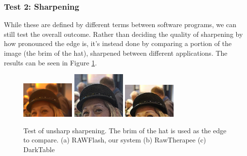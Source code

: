 \documentclass[10pt,a4paper]{article}
\begin{document}

\subsubsection{Test 2: Sharpening}
While these are defined by different terms between software programs, we can still test the overall outcome.
Rather than deciding the quality of sharpening by how pronounced the edge is, it's instead done by comparing a portion
of the image (the brim of the hat), sharpened between different applications. The results can be seen in Figure \ref{unsharpcomparison}.

\begin{figure}\label{unsharpcomparison}
    \centering
    \subfigure
    {
        \includegraphics[width=100px]{rawflash_hat_sharp}
    }
    \subfigure
    {
        \includegraphics[width=100px]{rawtherapee_unsharp_max}
    }
    \subfigure
    {
        \includegraphics[width=100px]{darktable_unsharp}
    }
    \caption{
        Test of unsharp sharpening. The brim of the hat is used as the edge to compare. 
        (a) RAWFlash, our system
        (b) RawTherapee
        (c) DarkTable
    }
    \label{unsharpcomparison}
 \end{figure}
\end{document}
